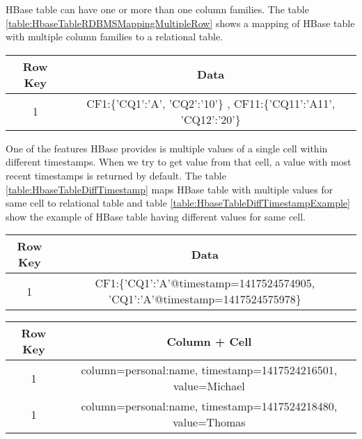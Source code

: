 \documentclass[11pt,a4paper,bibtotoc,idxtotoc,headsepline,footsepline,footexclude,BCOR12mm,DIV13]{scrbook}
\begin{document}
HBase table can have one or more than one column families. The table \ref{table:HbaseTableRDBMSMappingMultipleRow} shows a mapping of HBase table with multiple column families to a relational table.

\begin{table*}[htb!]
	\centering
	\begin{tabular}{|c|c|}
		\hline
		\textbf{Row Key} & \textbf{Data}\\
		\hline
		1 & CF1:\{'CQ1':'A', 'CQ2':'10'\}
		, CF11:\{'CQ11':'A11', 'CQ12':'20'\}\\

		\hline
	\end{tabular}
	\caption{HBase table with more than one CF}
	\label{table:HbaseTableRDBMSMappingMultipleRow}
\end{table*}

One of the features HBase provides is multiple values of a single cell within different timestamps. When we try to get value from that cell, a value with most recent timestamps is returned by default.  The table \ref{table:HbaseTableDiffTimestamp} maps HBase table with multiple values for same cell to relational table and table \ref{table:HbaseTableDiffTimestampExample} show the example of HBase table having different values for same cell.

\begin{table*}[htb!]
	\centering
	\begin{tabular}{|c|c|}
		\hline
		\textbf{Row Key} & \textbf{Data}\\
		\hline
		1 & CF1:\{'CQ1':'A'@timestamp=1417524574905, 'CQ1':'A'@timestamp=1417524575978\}\\
	
		
		\hline
	\end{tabular}
	\caption{HBase table with different values at different timestamp}
	\label{table:HbaseTableDiffTimestamp}
\end{table*}

\begin{table*}[htb!]
	\centering
	\begin{tabular}{|c|c|}
		\hline
		\textbf{Row Key} & \textbf{Column + Cell}\\
		\hline
		1 & column=personal:name, timestamp=1417524216501, value=Michael\\
		1 & column=personal:name, timestamp=1417524218480, value=Thomas\\
		
		\hline
	\end{tabular}
	\caption{HBase table with different values at different timestamp example}
	\label{table:HbaseTableDiffTimestampExample}
\end{table*}
\end{document}
